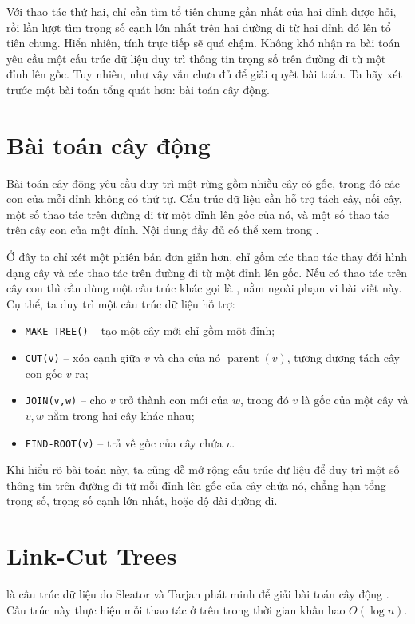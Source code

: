 \documentclass[11pt]{article}
\begin{document}
Với thao tác thứ hai, chỉ cần tìm tổ tiên chung gần nhất của hai đỉnh được hỏi,
rồi lần lượt tìm trọng số cạnh lớn nhất trên hai đường đi từ hai đỉnh đó lên
tổ tiên chung. Hiển nhiên, tính trực tiếp sẽ quá chậm. Không khó nhận ra bài
toán yêu cầu một cấu trúc dữ liệu duy trì thông tin trọng số trên đường đi từ
một đỉnh lên gốc. Tuy nhiên, như vậy vẫn chưa đủ để giải quyết bài toán. Ta
hãy xét trước một bài toán tổng quát hơn: bài toán cây động.

\section{Bài toán cây động}

Bài toán cây động yêu cầu duy trì một rừng gồm nhiều cây có gốc, trong đó các
con của mỗi đỉnh không có thứ tự. Cấu trúc dữ liệu cần hỗ trợ tách cây, nối
cây, một số thao tác trên đường đi từ một đỉnh lên gốc của nó, và một số thao
tác trên cây con của một đỉnh. Nội dung đầy đủ có thể xem trong \cite{st-dt}.

Ở đây ta chỉ xét một phiên bản đơn giản hơn, chỉ gồm các thao tác thay đổi hình
dạng cây và các thao tác trên đường đi từ một đỉnh lên gốc. Nếu có thao tác
trên cây con thì cần dùng một cấu trúc khác gọi là ,
nằm ngoài phạm vi bài viết này. Cụ thể, ta duy trì một cấu trúc dữ liệu hỗ trợ:
\begin{itemize}
  \item \texttt{MAKE-TREE()} -- tạo một cây mới chỉ gồm một đỉnh;
  \item \texttt{CUT(v)} -- xóa cạnh giữa $v$ và cha của nó $\operatorname{parent}(v)$,
  tương đương tách cây con gốc $v$ ra;
  \item \texttt{JOIN(v,w)} -- cho $v$ trở thành con mới của $w$, trong đó $v$
  là gốc của một cây và $v,w$ nằm trong hai cây khác nhau;
  \item \texttt{FIND-ROOT(v)} -- trả về gốc của cây chứa $v$.
\end{itemize}

Khi hiểu rõ bài toán này, ta cũng dễ mở rộng cấu trúc dữ liệu để duy trì một
số thông tin trên đường đi từ mỗi đỉnh lên gốc của cây chứa nó, chẳng hạn tổng
trọng số, trọng số cạnh lớn nhất, hoặc độ dài đường đi.

\section{Link-Cut Trees}

 là cấu trúc dữ liệu do Sleator và Tarjan phát minh để
giải bài toán cây động \cite{st-dt}. Cấu trúc này thực hiện mỗi thao tác ở
trên trong thời gian khấu hao $O(\log n)$.
\end{document}
